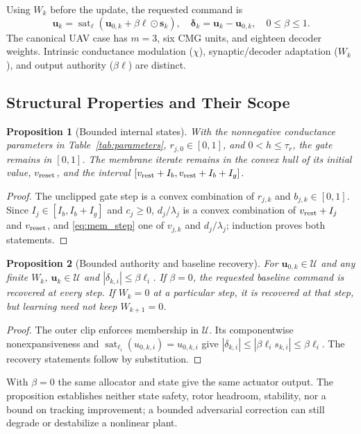 \documentclass[letterpaper, 10 pt, conference]{ieeeconf}
\newcommand{\sat}{\operatorname{sat}}
\newtheorem{proposition}{Proposition}
\begin{document}
Using $W_k$ before the update, the requested command is
\begin{equation}
 \bm u_k=\sat_{\bm\ell}(\bm u_{0,k}+\beta\bm\ell\odot\bm s_k),\quad
 \bm\delta_k=\bm u_k-\bm u_{0,k},\quad 0\le\beta\le1.
 \label{eq:residual}
\end{equation}
The canonical UAV case has $m=3$, six CMG units, and eighteen decoder
weights. Intrinsic conductance modulation ($\chi$), synaptic/decoder
adaptation ($W_k$), and output authority ($\beta\bm\ell$) are distinct.

\subsection{Structural Properties and Their Scope}
\begin{proposition}[Bounded internal states]
\label{prop:states}
With the nonnegative conductance parameters in Table~\ref{tab:parameters},
$r_{j,0}\in[0,1]$, and $0<h\le\tau_r$, the gate remains in $[0,1]$.
The membrane iterate remains in the convex hull of its initial value,
$v_{\rm reset}$, and the interval
$[v_{\rm rest}+I_b,v_{\rm rest}+I_b+I_g]$.
\end{proposition}
\begin{proof}
The unclipped gate step is a convex combination of $r_{j,k}$ and
$b_{j,k}\in[0,1]$. Since $I_j\in[I_b,I_b+I_g]$ and $c_j\ge0$,
$d_j/\lambda_j$ is a convex combination of $v_{\rm rest}+I_j$ and
$v_{\rm reset}$, and \eqref{eq:mem_step} one of $v_{j,k}$ and
$d_j/\lambda_j$; induction proves both statements.
\end{proof}

\begin{proposition}[Bounded authority and baseline recovery]
\label{prop:authority}
For $\bm u_{0,k}\in\mathcal U$ and any finite $W_k$,
$\bm u_k\in\mathcal U$ and $|\delta_{k,i}|\le\beta\ell_i$.
If $\beta=0$, the requested baseline command is recovered at every step.
If $W_k=0$ at a particular step, it is recovered at that step, but learning
need not keep $W_{k+1}=0$.
\end{proposition}
\begin{proof}
The outer clip enforces membership in $\mathcal U$. Its componentwise
nonexpansiveness and $\sat_{\ell_i}(u_{0,k,i})=u_{0,k,i}$ give
$|\delta_{k,i}|\le|\beta\ell_i s_{k,i}|\le\beta\ell_i$.
The recovery statements follow by substitution.
\end{proof}
With $\beta=0$ the same allocator and state give the same actuator output.
The proposition establishes neither state safety, rotor headroom,
stability, nor a bound on tracking improvement; a bounded adversarial
correction can still degrade or destabilize a nonlinear plant.
\end{document}
